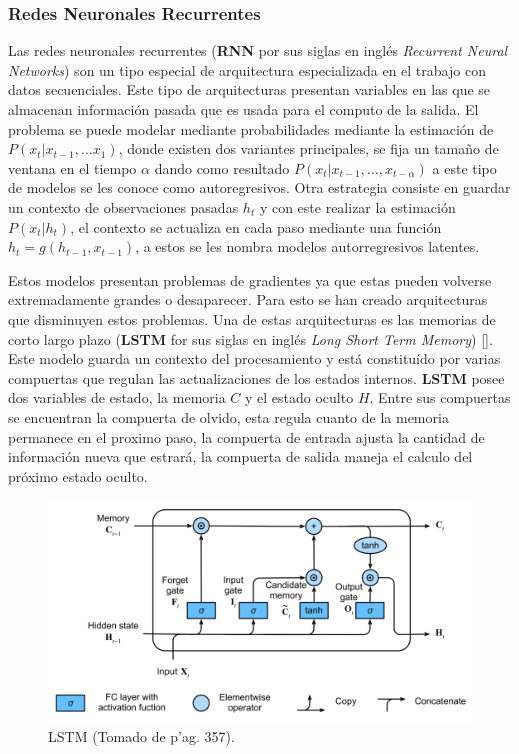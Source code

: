 \subsubsection{Redes Neuronales Recurrentes}

Las redes neuronales recurrentes (\textbf{RNN} por sus siglas en inglés \emph{Recurrent Neural Networks}) son
un tipo especial de arquitectura especializada en el trabajo con datos secuenciales. Este tipo de arquitecturas
presentan variables en las que se almacenan información pasada que es usada para el computo de la salida. El 
problema se puede modelar mediante probabilidades mediante la estimación de $P(x_t | x_{t-1}, \dots x_{1})$,
donde existen dos variantes principales, se fija un tamaño de ventana en el tiempo $\alpha$ dando como resultado
$P(x_t | x_{t-1}, \dots, x_{t-\alpha})$ a este tipo de modelos se les conoce como autoregresivos. Otra estrategia
consiste en guardar un contexto de observaciones pasadas $h_t$ y con este realizar la estimación $P(x_t | h_t)$,
el contexto se actualiza en cada paso mediante una función $h_t = g(h_{t-1}, x_{t-1})$, a estos se les nombra
modelos autorregresivos latentes. 

Estos modelos presentan problemas de gradientes ya que estas pueden volverse extremadamente grandes o desaparecer.
Para esto se han creado arquitecturas que disminuyen estos problemas. Una de estas arquitecturas es las memorias
de corto largo plazo (\textbf{LSTM} for sus siglas en inglés \emph{Long Short Term Memory}) [\cite{hochreiter1997long}].
Este modelo guarda un contexto del procesamiento y está constituído por varias compuertas que regulan las 
actualizaciones de los estados internos. \textbf{LSTM} posee dos variables de estado, la memoria $C$ y el estado 
oculto $H$. Entre sus compuertas se encuentran la compuerta de olvido, esta regula cuanto de la memoria permanece
en el proximo paso, la compuerta de entrada ajusta la cantidad de información nueva que estrará, la compuerta 
de salida maneja el calculo del próximo estado oculto.

\begin{figure}[h!]
	\begin{center}
		\begin{center}
			\includegraphics[scale=.3]{Graphics/rnn_lstm.png}
        \end{center}
	    \caption{LSTM (Tomado de \cite{d2l} p'ag. 357).}\label{fig:rnn_lstm}
	\end{center}
\end{figure}

